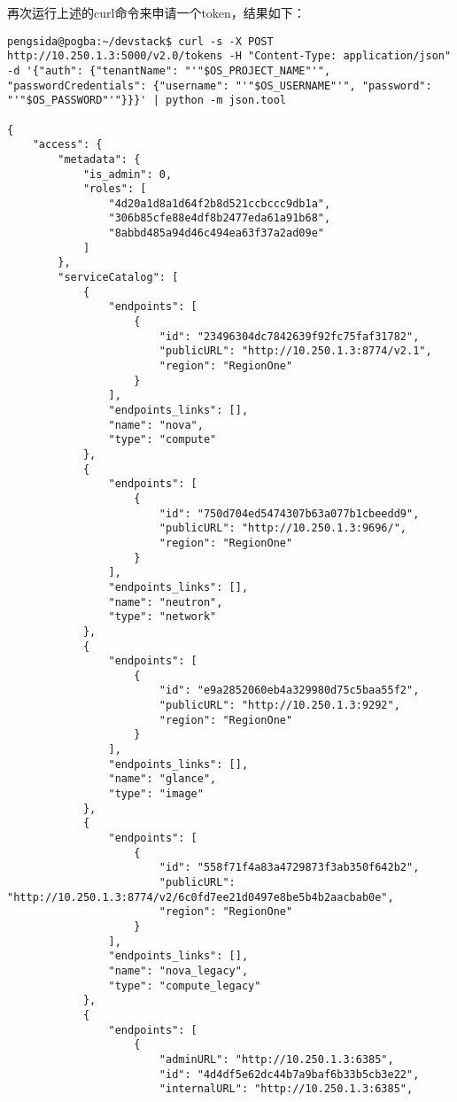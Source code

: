 \documentclass[a4paper,left=1.5cm,right=1.5cm,11pt]{article}
\begin{document}
	再次运行上述的curl命令来申请一个token，结果如下：
	\begin{lstlisting}
pengsida@pogba:~/devstack$ curl -s -X POST http://10.250.1.3:5000/v2.0/tokens -H "Content-Type: application/json" -d '{"auth": {"tenantName": "'"$OS_PROJECT_NAME"'", "passwordCredentials": {"username": "'"$OS_USERNAME"'", "password": "'"$OS_PASSWORD"'"}}}' | python -m json.tool

{
    "access": {
        "metadata": {
            "is_admin": 0,
            "roles": [
                "4d20a1d8a1d64f2b8d521ccbccc9db1a",
                "306b85cfe88e4df8b2477eda61a91b68",
                "8abbd485a94d46c494ea63f37a2ad09e"
            ]
        },
        "serviceCatalog": [
            {
                "endpoints": [
                    {
                        "id": "23496304dc7842639f92fc75faf31782",
                        "publicURL": "http://10.250.1.3:8774/v2.1",
                        "region": "RegionOne"
                    }
                ],
                "endpoints_links": [],
                "name": "nova",
                "type": "compute"
            },
            {
                "endpoints": [
                    {
                        "id": "750d704ed5474307b63a077b1cbeedd9",
                        "publicURL": "http://10.250.1.3:9696/",
                        "region": "RegionOne"
                    }
                ],
                "endpoints_links": [],
                "name": "neutron",
                "type": "network"
            },
            {
                "endpoints": [
                    {
                        "id": "e9a2852060eb4a329980d75c5baa55f2",
                        "publicURL": "http://10.250.1.3:9292",
                        "region": "RegionOne"
                    }
                ],
                "endpoints_links": [],
                "name": "glance",
                "type": "image"
            },
            {
                "endpoints": [
                    {
                        "id": "558f71f4a83a4729873f3ab350f642b2",
                        "publicURL": "http://10.250.1.3:8774/v2/6c0fd7ee21d0497e8be5b4b2aacbab0e",
                        "region": "RegionOne"
                    }
                ],
                "endpoints_links": [],
                "name": "nova_legacy",
                "type": "compute_legacy"
            },
            {
                "endpoints": [
                    {
                        "adminURL": "http://10.250.1.3:6385",
                        "id": "4d4df5e62dc44b7a9baf6b33b5cb3e22",
                        "internalURL": "http://10.250.1.3:6385",

\end{lstlisting}
\end{document}
